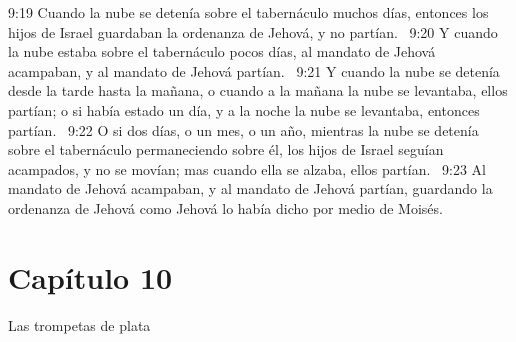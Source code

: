 9:19 Cuando la nube se detenía sobre el tabernáculo muchos días, entonces los hijos de Israel guardaban la ordenanza de Jehová, y no partían.  
9:20 Y cuando la nube estaba sobre el tabernáculo pocos días, al mandato de Jehová acampaban, y al mandato de Jehová partían.  
9:21 Y cuando la nube se detenía desde la tarde hasta la mañana, o cuando a la mañana la nube se levantaba, ellos partían; o si había estado un día, y a la noche la nube se levantaba, entonces partían.  
9:22 O si dos días, o un mes, o un año, mientras la nube se detenía sobre el tabernáculo permaneciendo sobre él, los hijos de Israel seguían acampados, y no se movían; mas cuando ella se alzaba, ellos partían.  
9:23 Al mandato de Jehová acampaban, y al mandato de Jehová partían, guardando la ordenanza de Jehová como Jehová lo había dicho por medio de Moisés.  
\section*{Capítulo 10}
Las trompetas de plata 

